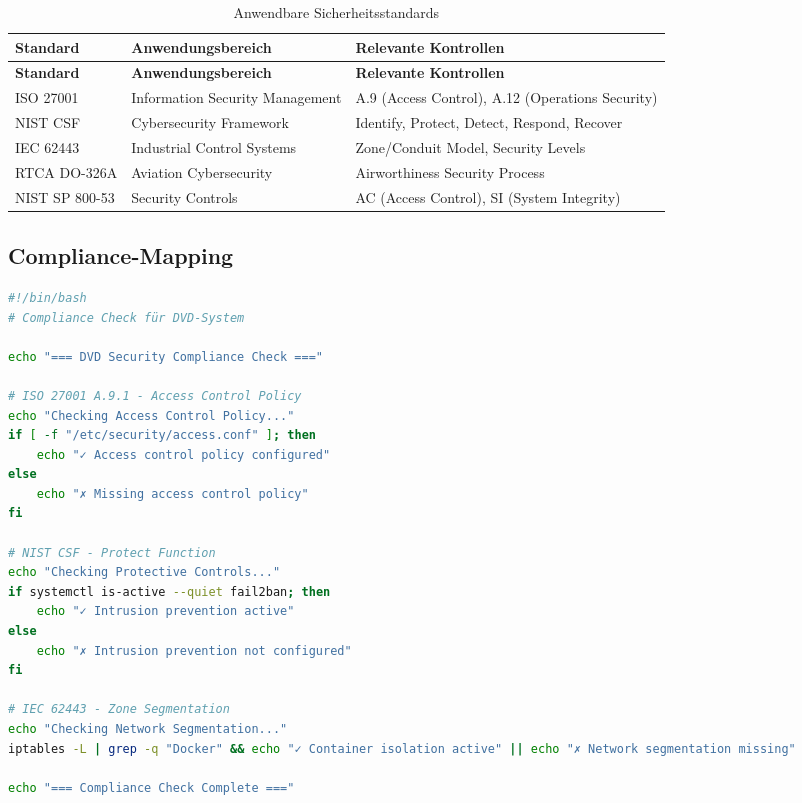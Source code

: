 \documentclass[11pt,a4paper]{article}
\begin{document}
\begin{longtable}{|l|p{5cm}|p{5cm}|}
\caption{Anwendbare Sicherheitsstandards} \\
\hline
\textbf{Standard} & \textbf{Anwendungsbereich} & \textbf{Relevante Kontrollen} \\
\hline
\endfirsthead
\hline
\textbf{Standard} & \textbf{Anwendungsbereich} & \textbf{Relevante Kontrollen} \\
\hline
\endhead
\hline
\endfoot
\hline
\endlastfoot

ISO 27001 & Information Security Management & A.9 (Access Control), A.12 (Operations Security) \\
\hline
NIST CSF & Cybersecurity Framework & Identify, Protect, Detect, Respond, Recover \\
\hline
IEC 62443 & Industrial Control Systems & Zone/Conduit Model, Security Levels \\
\hline
RTCA DO-326A & Aviation Cybersecurity & Airworthiness Security Process \\
\hline
NIST SP 800-53 & Security Controls & AC (Access Control), SI (System Integrity) \\
\hline
\end{longtable}

\subsection{Compliance-Mapping}

\begin{lstlisting}[language=bash, caption=Compliance-Check-Skript]
#!/bin/bash
# Compliance Check für DVD-System

echo "=== DVD Security Compliance Check ==="

# ISO 27001 A.9.1 - Access Control Policy
echo "Checking Access Control Policy..."
if [ -f "/etc/security/access.conf" ]; then
    echo "✓ Access control policy configured"
else
    echo "✗ Missing access control policy"
fi

# NIST CSF - Protect Function
echo "Checking Protective Controls..."
if systemctl is-active --quiet fail2ban; then
    echo "✓ Intrusion prevention active"
else
    echo "✗ Intrusion prevention not configured"
fi

# IEC 62443 - Zone Segmentation
echo "Checking Network Segmentation..."
iptables -L | grep -q "Docker" && echo "✓ Container isolation active" || echo "✗ Network segmentation missing"

echo "=== Compliance Check Complete ==="
\end{lstlisting}
\end{document}
